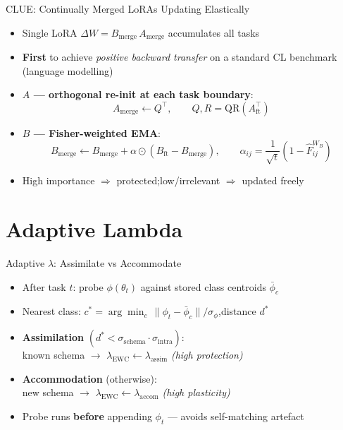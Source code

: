 \documentclass[10pt]{beamer}
\begin{document}
\begin{frame}{CLUE: Continually Merged LoRAs Updating Elastically}
\begin{itemize}[<+->]
  \item Single LoRA $\Delta W = B_\mathrm{merge}\,A_\mathrm{merge}$ accumulates all tasks
  \item \textbf{First} to achieve \emph{positive backward transfer} on a standard CL benchmark (language modelling)
  \medskip
  \item \textbf{$A$ — orthogonal re-init at each task boundary}:
    \[
      A_\mathrm{merge} \leftarrow Q^\top, \qquad Q,R = \mathrm{QR}\!\left(A_\mathrm{ft}^\top\right)
    \]
  \item \textbf{$B$ — Fisher-weighted EMA}:
    \[
      B_\mathrm{merge} \leftarrow B_\mathrm{merge} + \alpha\odot(B_\mathrm{ft}-B_\mathrm{merge}),
      \qquad \alpha_{ij} = \frac{1}{\sqrt{t}}\!\left(1 - \hat{F}_{ij}^{W_B}\right)
    \]
  \item High importance $\Rightarrow$ protected;\quad low/irrelevant $\Rightarrow$ updated freely
\end{itemize}
\end{frame}

\section{Adaptive Lambda}

\begin{frame}{Adaptive $\lambda$: Assimilate vs Accommodate}
\begin{itemize}[<+->]
  \item After task $t$: probe $\phi(\theta_t)$ against stored class centroids $\bar\phi_c$
  \item Nearest class: $c^* = \arg\min_c\,\|\phi_t - \bar\phi_c\|/\sigma_\phi$,\quad distance $d^*$
  \item \textbf{Assimilation} $(d^* < \sigma_\mathrm{schema}\cdot\sigma_\mathrm{intra})$:\\
    \quad known schema $\rightarrow$ $\lambda_\mathrm{EWC}\leftarrow\lambda_\mathrm{assim}$ \emph{(high protection)}
  \item \textbf{Accommodation} (otherwise):\\
    \quad new schema $\rightarrow$ $\lambda_\mathrm{EWC}\leftarrow\lambda_\mathrm{accom}$ \emph{(high plasticity)}
  \item Probe runs \textbf{before} appending $\phi_t$ — avoids self-matching artefact
\end{itemize}
\end{frame}
\end{document}
